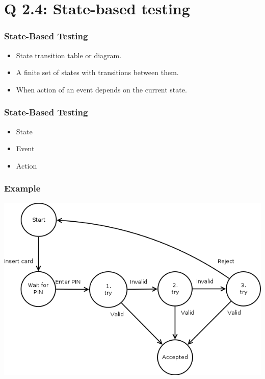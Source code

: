 
\section{Q 2.4: State-based testing}

\begin{frame}
    \frametitle{State-Based Testing}
    \begin{itemize}
        \item State transition table or diagram.
        \item A finite set of states with transitions between them.
        \item When action of an event depends on the current state.
    \end{itemize}
\end{frame}

\begin{frame}
    \frametitle{State-Based Testing}
    \begin{itemize}
        \item State
        \item Event
        \item Action
    \end{itemize}
\end{frame}

\begin{frame}
    \frametitle{Example}
    \centering
    \includegraphics[scale=0.4]{state_transition_diagram.png}
\end{frame}

